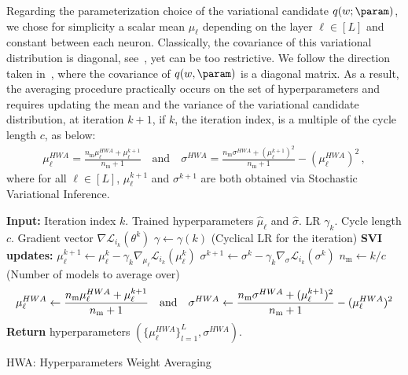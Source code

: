 \documentclass{article} %
\begin{document}
Regarding the parameterization choice of the variational candidate $q( w; \param )$, we chose for simplicity a scalar mean $\mu_{\ell}$ depending on the layer $\ell \in [L]$ and constant between each neuron. Classically, the covariance of this variational distribution is diagonal, see~\citep{kirkpatrick2017overcoming, blundell2015weight}, yet can be too restrictive.
We follow the direction taken in~\citep{maddox2019simple}, where the covariance of $q(w, \param)$ is a diagonal matrix.
As a result, the averaging procedure practically occurs on the set of hyperparameters and requires updating the mean and the variance of the variational candidate distribution, at iteration $k+1$, if $k$, the iteration index, is a multiple of the cycle length $c$,  as below:
\begin{equation}\label{eq:hwa_updates}
\begin{split}
 \mu_{\ell}^{HWA}  =  \frac{n_{\textrm{m}}\mu_{\ell}^{HWA} + \mu_{\ell}^{k+1}}{n_{\textrm{m}}+1}  \quad \textrm{and} \quad  \sigma^{HWA}   =  \frac{n_{\textrm{m}}\sigma^{HWA} + (\mu_{\ell}^{k+1})^2}{n_{\textrm{m}}+1} -( \mu_{\ell}^{HWA})^2 \, ,
\end{split}
\end{equation}
where for all $\ell \in [L]$, $\mu_{\ell}^{k+1}$ and $\sigma^{k+1}$ are both obtained via Stochastic Variational Inference.


\begin{algorithm}[H]
\begin{algorithmic}[1]
\STATE \textbf{Input:} Iteration index $k$. Trained hyperparameters $\hat{\mu}_{\ell}$ and $\hat{\sigma}$. LR $\gamma_k$. Cycle length $c$. Gradient vector $\nabla \mathcal{L}_{i_{k}}(\theta^{k})$
\STATE $\gamma \leftarrow \gamma(k)$ (Cyclical LR for the iteration)
\STATE \textbf{SVI updates:}
\STATE \quad $\mu_{\ell}^{k+1} \leftarrow \mu_{\ell}^{k} - \gamma_k \nabla_{\mu_{\ell}} \mathcal{L}_{i_{k}}(\mu_{\ell}^{k})$  \label{line:svi}
\STATE \quad $\sigma^{k+1} \leftarrow \sigma^{k} - \gamma_k \nabla_{\sigma} \mathcal{L}_{i_{k}}(\sigma^{k})$ \label{line:svisigma}
	\STATE \quad $n_{\textrm{m}} \leftarrow k/c$ \quad (Number of models to average over)
\begin{equation}\notag
\mu_{\ell}^{HWA} \leftarrow \frac{n_{\textrm{m}}\mu_{\ell}^{HWA} + \mu_{\ell}^{k+1}}{n_{\textrm{m}}+1} \quad \textrm{and} \quad \sigma^{HWA} \leftarrow \frac{n_{\textrm{m}}\sigma^{HWA} + (\mu_{\ell}^{k+1})^2}{n_{\textrm{m}}+1} -( \mu_{\ell}^{HWA})^2
\end{equation}
\ENDIF
\STATE \textbf{Return} hyperparameters $(\{\mu_{\ell}^{HWA}\}_{l=1}^L, \sigma^{HWA})$.
\end{algorithmic}
\caption{HWA: Hyperparameters Weight Averaging}
\label{alg:hwa}
\end{algorithm}
\end{document}
